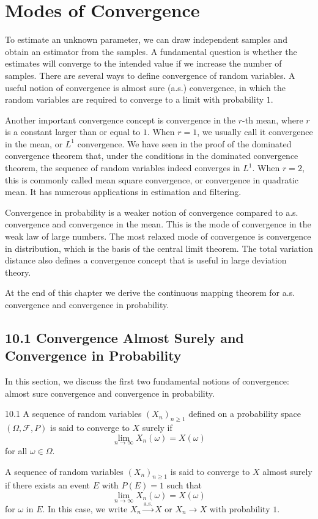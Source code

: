 \section*{Modes of Convergence}

To estimate an unknown parameter, we can draw independent samples and obtain an estimator from the samples. A fundamental question is whether the estimates will converge to the intended value if we increase the number of samples. There are several ways to define convergence of random variables. A useful notion of convergence is almost sure (a.s.) convergence, in which the random variables are required to converge to a limit with probability $1$.

Another important convergence concept is convergence in the $r$-th mean, where $r$ is a constant larger than or equal to $1$. When $r=1$, we usually call it convergence in the mean, or $L^1$ convergence. We have seen in the proof of the dominated convergence theorem that, under the conditions in the dominated convergence theorem, the sequence of random variables indeed converges in $L^1$. When $r=2$, this is commonly called mean square convergence, or convergence in quadratic mean. It has numerous applications in estimation and filtering.

Convergence in probability is a weaker notion of convergence compared to a.s. convergence and convergence in the mean. This is the mode of convergence in the weak law of large numbers. The most relaxed mode of convergence is convergence in distribution, which is the basis of the central limit theorem. The total variation distance also defines a convergence concept that is useful in large deviation theory.

At the end of this chapter we derive the continuous mapping theorem for a.s. convergence and convergence in probability.

\subsection*{10.1 Convergence Almost Surely and Convergence in Probability}

In this section, we discuss the first two fundamental notions of convergence: almost sure convergence and convergence in probability.

\begin{defbox}{10.1}
A sequence of random variables $(X_n)_{n\geq 1}$ defined on a probability space $(\Omega,\mathcal{F},P)$ is said to converge to $X$ surely if
\[
\lim_{n\to\infty} X_n(\omega)=X(\omega)
\]
for all $\omega\in\Omega$.

A sequence of random variables $(X_n)_{n\geq 1}$ is said to converge to $X$ almost surely if there exists an event $E$ with $P(E)=1$ such that
\[
\lim_{n\to\infty} X_n(\omega)=X(\omega)
\]
for $\omega$ in $E$. In this case, we write $X_n\xrightarrow{\mathrm{a.s.}}X$ or $X_n\to X$ with probability $1$.
\end{defbox}

